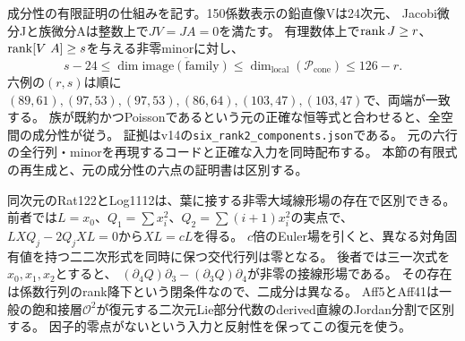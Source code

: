 成分性の有限証明の仕組みを記す。150係数表示の鉛直像Vは24次元、
Jacobi微分Jと族微分Aは整数上で$JV=JA=0$を満たす。
有理数体上で$\operatorname{rank} J\ge r$、$\operatorname{rank}[V\ A]\ge s$を与える非零minorに対し、
\[
 s-24\le\dim\overline{\mathrm{image}(\mathrm{family})}
 \le\dim_{\mathrm{local}}(\mathcal P_{\mathrm{cone}})\le126-r.
\]
六例の$(r,s)$は順に$(89,61),(97,53),(97,53),(86,64),(103,47),(103,47)$で、両端が一致する。
族が既約かつPoissonであるという元の正確な恒等式と合わせると、全空間の成分性が従う。
証拠はv14の\texttt{six\_rank2\_components.json}である。
元の六行の全行列・minorを再現するコードと正確な入力を同時配布する。
本節の有限式の再生成と、元の成分性の六点の証明書は区別する。

同次元のRat122とLog1112は、葉に接する非零大域線形場の存在で区別できる。
前者では$L=x_0$、$Q_1=\sum x_i^2$、$Q_2=\sum(i+1)x_i^2$の実点で、
$L XQ_j-2Q_jXL=0$から$XL=cL$を得る。
$c$倍のEuler場を引くと、異なる対角固有値を持つ二二次形式を同時に保つ交代行列は零となる。
後者では三一次式を$x_0,x_1,x_2$とすると、
$(\partial_4Q)\partial_3-(\partial_3Q)\partial_4$が非零の接線形場である。
その存在は係数行列のrank降下という閉条件なので、二成分は異なる。
Aff5とAff41は一般の飽和接層$\mathcal O^2$が復元する二次元Lie部分代数のderived直線のJordan分割で区別する。
因子的零点がないという入力と反射性を保ってこの復元を使う。

